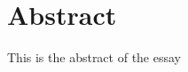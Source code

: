 \documentclass[../main.tex]{subfiles}
\begin{document}
\section*{Abstract}
This is the abstract of the essay
\end{document}
